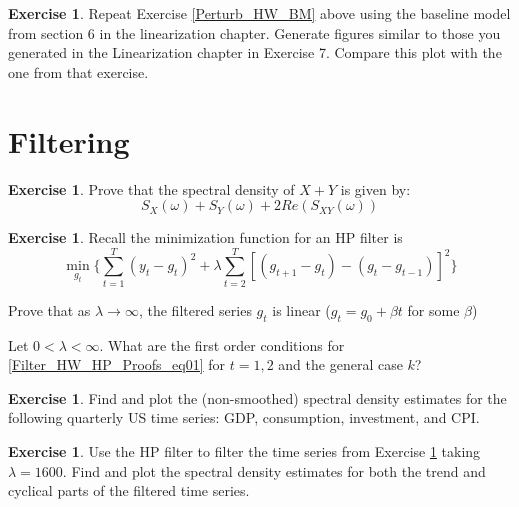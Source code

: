 \documentclass[letterpaper,12pt]{article}
\theoremstyle{definition}
\newtheorem{exercise}[theorem]{Exercise}
\begin{document}
\begin{spacing}{1.5}
	\begin{exercise} \label{Perturb_HW_BAse}
		Repeat Exercise \ref{Perturb_HW_BM} above using the baseline model from section 6 in the linearization chapter.  Generate figures similar to those you generated in the Linearization chapter in Exercise 7.  Compare this plot with the one from that exercise.
	\end{exercise}


\section*{Filtering}\label{Filter_HW} 

    \begin{exercise} \label{Filter_HW_CoVar_Proof} 
        Prove that the spectral density of $X+Y$ is given by:
        $$S_X(\omega) + S_Y(\omega) + 2 Re(S_{XY}(\omega))$$
    \end{exercise}

    \begin{exercise} \label{Filter_HW_HP_Proofs} 
        Recall the minimization function for an HP filter is
        \begin{equation}\label{Filter_HW_HP_Proofs_eq01}
        \min_{g_t} \{ \sum_{t=1}^T (y_t - g_t)^2  +\lambda\sum_{t=2}^T[(g_{t+1}-g_{t}) - (g_{t}-g_{t-1})]^2\}
        \end{equation}

        Prove that as $\lambda \rightarrow \infty$, the filtered series $g_t$ is linear ($g_t = g_0 + \beta t$ for some $\beta$)

        Let $0 <\lambda < \infty$. What are the first order conditions for \ref{Filter_HW_HP_Proofs_eq01} for $t = 1, 2$ and the general case $k$? 
    \end{exercise}

    \begin{exercise} \label{Filter_HW_Periodograms} 
        Find and plot the (non-smoothed) spectral density estimates for the following quarterly US time series: GDP, consumption, investment, and CPI.
    \end{exercise}
    
    \begin{exercise} \label{Filter_HW_Periodograms_Filtered} 
        Use the HP filter to filter the time series from Exercise \ref{Filter_HW_Periodograms} taking $\lambda = 1600$. Find and plot the spectral density estimates for both the trend and cyclical parts of the filtered time series.
    \end{exercise}
    

\end{spacing}
\end{document}
